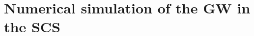 
\chapter[Numerical simulation of the GW in the SCS]{Numerical simulation of the GW in the SCS}
\label{ch:simulation}









